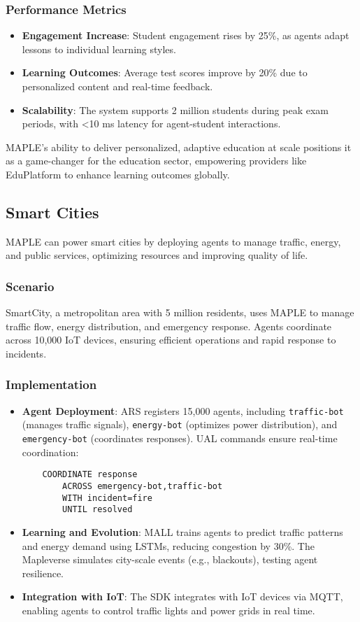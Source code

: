 \documentclass[a4paper,11pt]{article}
\begin{document}
\subsubsection{Performance Metrics}
\begin{itemize}[leftmargin=*]
    \item \textbf{Engagement Increase}: Student engagement rises by 25\%, as agents adapt lessons to individual learning styles.
    \item \textbf{Learning Outcomes}: Average test scores improve by 20\% due to personalized content and real-time feedback.
    \item \textbf{Scalability}: The system supports 2 million students during peak exam periods, with <10 ms latency for agent-student interactions.
\end{itemize}

MAPLE’s ability to deliver personalized, adaptive education at scale positions it as a game-changer for the education sector, empowering providers like EduPlatform to enhance learning outcomes globally.

\subsection{Smart Cities}
MAPLE can power smart cities by deploying agents to manage traffic, energy, and public services, optimizing resources and improving quality of life.

\subsubsection{Scenario}
SmartCity, a metropolitan area with 5 million residents, uses MAPLE to manage traffic flow, energy distribution, and emergency response. Agents coordinate across 10,000 IoT devices, ensuring efficient operations and rapid response to incidents.

\subsubsection{Implementation}
\begin{itemize}[leftmargin=*]
    \item \textbf{Agent Deployment}: ARS registers 15,000 agents, including \texttt{traffic-bot} (manages traffic signals), \texttt{energy-bot} (optimizes power distribution), and \texttt{emergency-bot} (coordinates responses). UAL commands ensure real-time coordination:
    \begin{verbatim}
    COORDINATE response
        ACROSS emergency-bot,traffic-bot
        WITH incident=fire
        UNTIL resolved
    \end{verbatim}
    \item \textbf{Learning and Evolution}: MALL trains agents to predict traffic patterns and energy demand using LSTMs, reducing congestion by 30\%. The Mapleverse simulates city-scale events (e.g., blackouts), testing agent resilience.
    \item \textbf{Integration with IoT}: The SDK integrates with IoT devices via MQTT, enabling agents to control traffic lights and power grids in real time.
\end{itemize}
\end{document}
